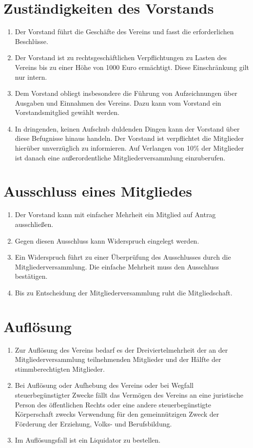 \documentclass[ngerman]{article}
\begin{document}
\section{Zuständigkeiten des Vorstands}
\begin{enumerate}
\item Der Vorstand führt die Geschäfte des Vereins und fasst die erforderlichen Beschlüsse.
\item Der Vorstand ist zu rechtsgeschäftlichen Verpflichtungen zu Lasten des Vereins bis zu einer Höhe von 1000 Euro ermächtigt. Diese Einschränkung gilt nur intern.
\item Dem Vorstand obliegt insbesondere die Führung von Aufzeichnungen über Ausgaben und Einnahmen des Vereins. Dazu kann vom Vorstand ein Vorstandsmitglied gewählt werden.
\item In dringenden, keinen Aufschub duldenden Dingen kann der Vorstand über diese Befugnisse hinaus handeln. Der Vorstand ist verpflichtet
die Mitglieder hierüber unverzüglich zu informieren. Auf Verlangen von 10\% der Mitglieder ist danach eine außerordentliche Mitgliederversammlung einzuberufen.
\end{enumerate}

\section{Ausschluss eines Mitgliedes}
\begin{enumerate}
\item Der Vorstand kann mit einfacher Mehrheit ein Mitglied auf Antrag ausschließen.
\item Gegen diesen Ausschluss kann Widerspruch eingelegt werden.
\item Ein Widerspruch führt zu einer Überprüfung des Ausschlusses durch die Mitgliederversammlung. Die einfache Mehrheit muss den Ausschluss
bestätigen.
\item Bis zu Entscheidung der Mitgliederversammlung ruht die Mitgliedschaft.
\end{enumerate}

\section{Auflösung}
\begin{enumerate}
\item Zur Auflösung des Vereins bedarf es der Dreiviertelmehrheit der an der Mitgliederversammlung teilnehmenden Mitglieder und der Hälfte
der stimmberechtigten Mitglieder.
\item Bei Auflösung oder Aufhebung des Vereins oder bei Wegfall steuerbegünstigter Zwecke fällt das Vermögen des Vereins an eine juristische Person des öffentlichen Rechts oder eine andere steuerbegünstigte Körperschaft zwecks Verwendung für den gemeinnützigen Zweck der Förderung der Erziehung, Volks- und Berufsbildung.
\item Im Auflösungsfall ist ein Liquidator zu bestellen.
\end{enumerate}
\end{document}

